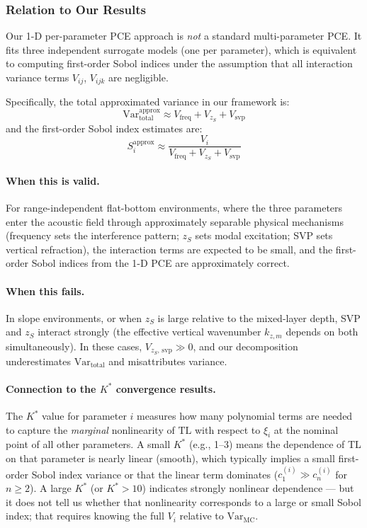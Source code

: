 \documentclass[11pt,a4paper]{article}
\newcommand{\Var}{\mathrm{Var}}
\newcommand{\TL}{\mathrm{TL}}
\begin{document}
\subsubsection{Relation to Our Results}

Our 1-D per-parameter PCE approach is \emph{not} a standard multi-parameter PCE.
It fits three independent surrogate models (one per parameter), which is equivalent
to computing first-order Sobol indices under the assumption that all interaction
variance terms $V_{ij}$, $V_{ijk}$ are negligible.

Specifically, the total approximated variance in our framework is:
\begin{equation}
  \Var_\text{total}^\text{approx} \approx V_\text{freq} + V_{z_S} + V_\text{svp}
\end{equation}
and the first-order Sobol index estimates are:
\begin{equation}
  S_i^\text{approx} \approx \frac{V_i}{V_\text{freq} + V_{z_S} + V_\text{svp}}
\end{equation}

\paragraph{When this is valid.}
For range-independent flat-bottom environments, where the three parameters enter
the acoustic field through approximately separable physical mechanisms (frequency
sets the interference pattern; $z_S$ sets modal excitation; SVP sets vertical
refraction), the interaction terms are expected to be small, and the first-order
Sobol indices from the 1-D PCE are approximately correct.

\paragraph{When this fails.}
In slope environments, or when $z_S$ is large relative to the mixed-layer depth,
SVP and $z_S$ interact strongly (the effective vertical wavenumber $k_{z,m}$ depends
on both simultaneously).  In these cases, $V_{z_S,\,\mathrm{svp}} \gg 0$, and our
decomposition underestimates $\Var_\text{total}$ and misattributes variance.

\paragraph{Connection to the $K^*$ convergence results.}
The $K^*$ value for parameter $i$ measures how many polynomial terms are needed to
capture the \emph{marginal} nonlinearity of $\TL$ with respect to $\xi_i$ at the
nominal point of all other parameters.  A small $K^*$ (e.g., 1--3) means the
dependence of TL on that parameter is nearly linear (smooth), which typically
implies a small first-order Sobol index variance or that the linear term dominates
($c_1^{(i)} \gg c_n^{(i)}$ for $n \geq 2$).  A large $K^*$ (or $K^* > 10$)
indicates strongly nonlinear dependence — but it does not tell us whether that
nonlinearity corresponds to a large or small Sobol index; that requires knowing
the full $V_i$ relative to $\Var_\text{MC}$.
\end{document}
